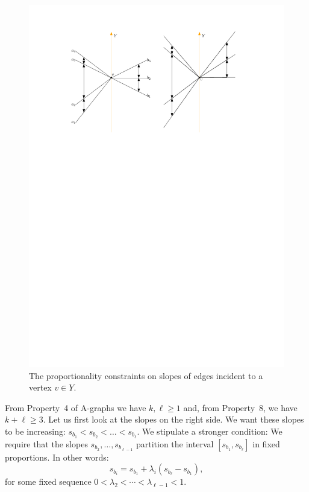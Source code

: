 \begin{figure}
  \begin{center}
    \includegraphics{figs/proportional}
  \end{center}
  \caption{The proportionality constraints on slopes of edges incident to a vertex $v\in Y$.}
\end{figure}
From Property~4 of A-graphs we have $k,\ell\ge1$ and, from Property~8, we have $k+\ell\ge 3$.
Let us first look at the slopes on the right side.
We want these slopes to be increasing:
$s_{b_1} < s_{b_2} < \dots  <s_{b_\ell}$. We stipulate a stronger
condition:
We require that the slopes
$s_{b_2}, \dots, s_{b_{\ell-1}}$ partition the interval
$[s_{b_1},s_{b_\ell}]$ in fixed proportions. In other words:
\begin{equation}
\label{eq:proportion}
s_{b_i} = s_{b_1} + \lambda_i(s_{b_{\ell}}-s_{b_1}),
\end{equation}
for some fixed sequence $0<\lambda_2<\cdots<\lambda_{\ell-1}<1$.

